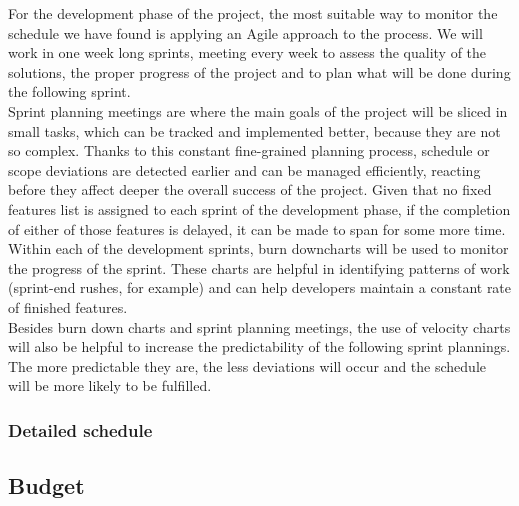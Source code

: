 For the development phase of the project, the most suitable way to monitor the schedule we have found is applying an Agile approach to the process. We will work in one week long sprints, meeting every week to assess the quality of the solutions, the proper progress of the project and to plan what will be done during the following sprint.\\

Sprint planning meetings are where the main goals of the project will be sliced in small tasks, which can be tracked and implemented better, because they are not so complex. Thanks to this constant fine-grained planning process, schedule or scope deviations are detected earlier and can be managed efficiently, reacting before they affect deeper the overall success of the project. Given that no fixed features list is assigned to each sprint of the development phase, if the completion of either of those features is delayed, it can be made to span for some more time.\\

Within each of the development sprints, burn downcharts will be used to monitor the progress of the sprint. These charts are helpful in identifying patterns of work (sprint-end rushes, for example) and can help developers maintain a constant rate of finished features.\\

Besides burn down charts and sprint planning meetings, the use of velocity charts will also be helpful to increase the predictability of the following sprint plannings. The more predictable they are, the less deviations will occur and the schedule will be more likely to be fulfilled.

\subsubsection{Detailed schedule}
\subsection{Budget}